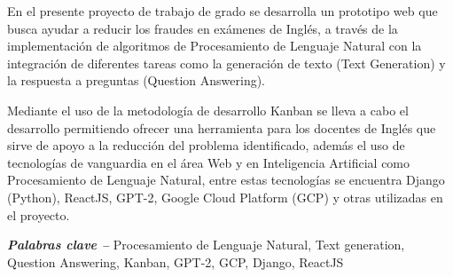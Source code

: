 \documentclass[../Main.tex]{subfiles}
\begin{document}
\begin{justify}
En el presente proyecto de trabajo de grado se desarrolla un prototipo web que busca ayudar a reducir los fraudes en exámenes de Inglés, a través de la implementación de algoritmos de Procesamiento de Lenguaje Natural con la integración de diferentes tareas como la generación de texto (Text Generation) y la respuesta a preguntas (Question Answering). 

Mediante el uso de la metodología de desarrollo Kanban se lleva a cabo el desarrollo permitiendo ofrecer una herramienta para los docentes de Inglés que sirve de apoyo a la reducción del problema identificado, además el uso de tecnologías de vanguardia en el área Web y en Inteligencia Artificial como Procesamiento de Lenguaje Natural, entre estas tecnologías se encuentra Django (Python), ReactJS, GPT-2, Google Cloud Platform (GCP) y otras utilizadas en el proyecto.
\end{justify}


\par\vspace*{\fill} %
\textbf{\textit{Palabras clave --}} Procesamiento de Lenguaje Natural, Text generation, Question Answering, Kanban, GPT-2, GCP, Django, ReactJS  %
\end{document}
